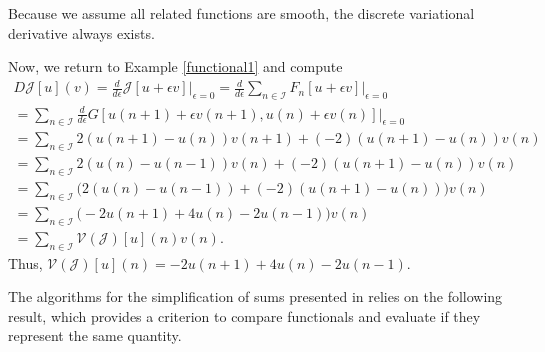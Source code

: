 \documentclass[runningheads]{llncs}
\newcommand{\1}{\chi}
\begin{document}
Because we assume all related functions are smooth, the discrete variational derivative always exists.
\begin{example}
Now, we return to Example \ref{functional1} and compute
	\begin{gather*}
		D\mathcal{J}[u](v)=\frac{d}{d\epsilon}\mathcal{J}[u+\epsilon v]\bigg|_{\epsilon=0}=\frac{d}{d\epsilon}\sum_{n\in\mathcal{I}}F_n[u+\epsilon v]\bigg|_{\epsilon=0}\\
		=\sum_{n\in\mathcal{I}}\frac{d}{d\epsilon}G[u(n+1)+\epsilon v(n+1),u(n)+\epsilon v(n)]\bigg|_{\epsilon=0}\\
		=\sum_{n\in\mathcal{I}}2(u(n+1)-u(n))v(n+1)+(-2)(u(n+1)-u(n))v(n)\\
		=\sum_{n\in\mathcal{I}}2(u(n)-u(n-1))v(n)+(-2)(u(n+1)-u(n))v(n)\\
		=\sum_{n\in\mathcal{I}}\Big(2(u(n)-u(n-1))+(-2)(u(n+1)-u(n))\Big)v(n)\\
		=\sum_{n\in\mathcal{I}}\Big(-2u(n+1)+4u(n)-2u(n-1)\Big)v(n)\\
		=\sum_{n\in\mathcal{I}}\mathcal{V}(\mathcal{J})[u](n)v(n).
	\end{gather*}
Thus, \(\mathcal{V}(\mathcal{J})[u](n)=-2u(n+1)+4u(n)-2u(n-1)\).
\end{example}
The algorithms for the simplification of sums presented in \cite{gomes20} relies on the following result, which 
provides a criterion to compare functionals and evaluate if they represent the same quantity.
\end{document}
